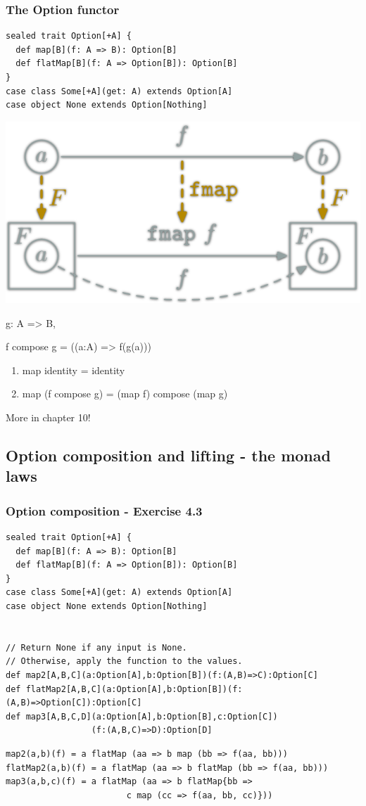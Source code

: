 \documentclass{beamer}
\begin{document}
\begin{frame}[fragile,t]
  \frametitle{The {\ttfamily Option} functor}
\begin{lstlisting}
sealed trait Option[+A] {
  def map[B](f: A => B): Option[B]
  def flatMap[B](f: A => Option[B]): Option[B]
}
case class Some[+A](get: A) extends Option[A]
case object None extends Option[Nothing]
\end{lstlisting}
  \begin{center}
    \includegraphics[scale=0.15]{boxfunctor.png}
  \end{center}
  {\ttfamily g: A => B},

  {\ttfamily f compose g = ((a:A) => f(g(a)))}
  \begin{enumerate}
    \item {\ttfamily map identity = identity}
    \item {\ttfamily map (f compose g) = (map f) compose (map g)}
  \end{enumerate}
  More in chapter 10!
\end{frame}

\subsection{{\ttfamily Option} composition and lifting - the monad laws}

\begin{frame}[fragile,t]
  \frametitle{{\ttfamily Option} composition - Exercise 4.3}
\begin{lstlisting}
sealed trait Option[+A] {
  def map[B](f: A => B): Option[B]
  def flatMap[B](f: A => Option[B]): Option[B]
}
case class Some[+A](get: A) extends Option[A]
case object None extends Option[Nothing]


// Return None if any input is None.
// Otherwise, apply the function to the values.
def map2[A,B,C](a:Option[A],b:Option[B])(f:(A,B)=>C):Option[C]
def flatMap2[A,B,C](a:Option[A],b:Option[B])(f:(A,B)=>Option[C]):Option[C]
def map3[A,B,C,D](a:Option[A],b:Option[B],c:Option[C])
                 (f:(A,B,C)=>D):Option[D]
\end{lstlisting}
\pause
\begin{lstlisting}
map2(a,b)(f) = a flatMap (aa => b map (bb => f(aa, bb)))
flatMap2(a,b)(f) = a flatMap (aa => b flatMap (bb => f(aa, bb)))
map3(a,b,c)(f) = a flatMap (aa => b flatMap{bb =>
                        c map (cc => f(aa, bb, cc)}))
\end{lstlisting}
\end{frame}
\end{document}
